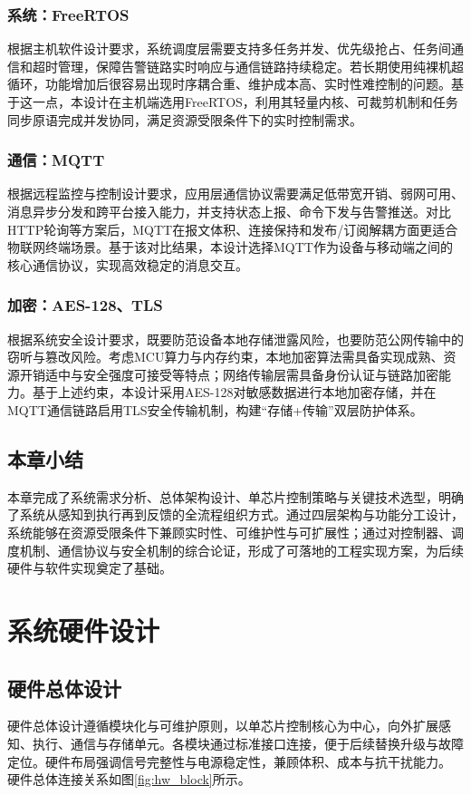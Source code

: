 \documentclass[UTF8,12pt,a4paper,oneside]{ctexbook}
\numberwithin{equation}{chapter}
\begin{document}
\subsection{系统：FreeRTOS}
根据主机软件设计要求，系统调度层需要支持多任务并发、优先级抢占、任务间通信和超时管理，保障告警链路实时响应与通信链路持续稳定。若长期使用纯裸机超循环，功能增加后很容易出现时序耦合重、维护成本高、实时性难控制的问题。基于这一点，本设计在主机端选用FreeRTOS，利用其轻量内核、可裁剪机制和任务同步原语完成并发协同，满足资源受限条件下的实时控制需求\cite{freertos_book,freertos_sched}。
\subsection{通信：MQTT}
根据远程监控与控制设计要求，应用层通信协议需要满足低带宽开销、弱网可用、消息异步分发和跨平台接入能力，并支持状态上报、命令下发与告警推送。对比HTTP轮询等方案后，MQTT在报文体积、连接保持和发布/订阅解耦方面更适合物联网终端场景。基于该对比结果，本设计选择MQTT作为设备与移动端之间的核心通信协议，实现高效稳定的消息交互\cite{mqtt_spec,mqtt_v5}。
\subsection{加密：AES-128、TLS}
根据系统安全设计要求，既要防范设备本地存储泄露风险，也要防范公网传输中的窃听与篡改风险。考虑MCU算力与内存约束，本地加密算法需具备实现成熟、资源开销适中与安全强度可接受等特点；网络传输层需具备身份认证与链路加密能力。基于上述约束，本设计采用AES-128对敏感数据进行本地加密存储，并在MQTT通信链路启用TLS安全传输机制，构建“存储+传输”双层防护体系\cite{aes_fips197,rfc5246,tls_rfc}。

\section{本章小结}
本章完成了系统需求分析、总体架构设计、单芯片控制策略与关键技术选型，明确了系统从感知到执行再到反馈的全流程组织方式。通过四层架构与功能分工设计，系统能够在资源受限条件下兼顾实时性、可维护性与可扩展性；通过对控制器、调度机制、通信协议与安全机制的综合论证，形成了可落地的工程实现方案，为后续硬件与软件实现奠定了基础。

\chapter{系统硬件设计}
\section{硬件总体设计}
硬件总体设计遵循模块化与可维护原则，以单芯片控制核心为中心，向外扩展感知、执行、通信与存储单元。各模块通过标准接口连接，便于后续替换升级与故障定位。硬件布局强调信号完整性与电源稳定性，兼顾体积、成本与抗干扰能力。
硬件总体连接关系如图\ref{fig:hw_block}所示。
\end{document}
